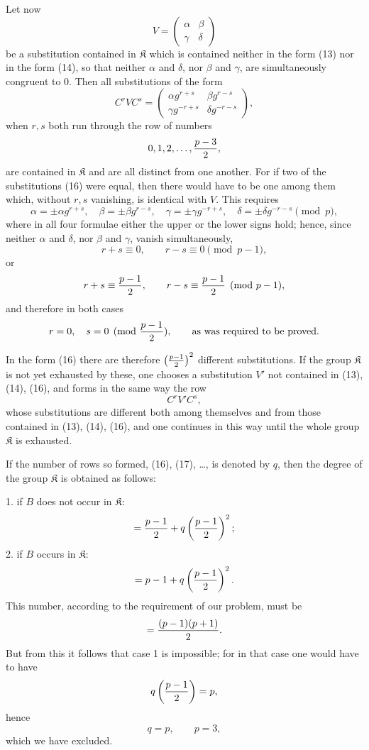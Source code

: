 \documentclass[11pt]{article}
\providecommand{\Kgrp}{\mathfrak K}
\begin{document}
Let now
\begin{equation}
 V=\begin{pmatrix}\alpha&\beta\\ \gamma&\delta\end{pmatrix}
\tag{15}
\end{equation}
be a substitution contained in $\Kgrp$ which is contained neither in the form (13) nor in the form (14), so that neither $\alpha$ and $\delta$, nor $\beta$ and $\gamma$, are simultaneously congruent to $0$. Then all substitutions of the form
\begin{equation}
 C^rVC^s=
 \begin{pmatrix}
 \alpha g^{r+s} & \beta g^{r-s}\\
 \gamma g^{-r+s} & \delta g^{-r-s}
 \end{pmatrix},
\tag{16}
\end{equation}
when $r,s$ both run through the row of numbers
\[
 0,1,2,\ldots,{p-3\over2},
\]
are contained in $\Kgrp$ and are all distinct from one another. For if two of the substitutions (16) were equal, then there would have to be one among them which, without $r,s$ vanishing, is identical with $V$. This requires
\[
 \alpha=\pm\alpha g^{r+s},\quad
 \beta=\pm\beta g^{r-s},\quad
 \gamma=\pm\gamma g^{-r+s},\quad
 \delta=\pm\delta g^{-r-s}\pmod p,
\]
where in all four formulae either the upper or the lower signs hold; hence, since neither $\alpha$ and $\delta$, nor $\beta$ and $\gamma$, vanish simultaneously,
\[
 r+s\equiv0,\qquad r-s\equiv0\pmod{p-1},
\]
or
\[
 r+s\equiv{p-1\over2},\qquad r-s\equiv{p-1\over2}\pmod{p-1},
\]
and therefore in both cases
\[
 r=0,\quad s=0\pmod{{p-1\over2}},\qquad\text{as was required to be proved.}
\]

In the form (16) there are therefore $\left({p-1\over2}\right)^2$ different substitutions. If the group $\Kgrp$ is not yet exhausted by these, one chooses a substitution $V'$ not contained in (13), (14), (16), and forms in the same way the row
\begin{equation}
 C^rV'C^s,
\tag{17}
\end{equation}
whose substitutions are different both among themselves and from those contained in (13), (14), (16), and one continues in this way until the whole group $\Kgrp$ is exhausted.

If the number of rows so formed, (16), (17), \ldots, is denoted by $q$, then the degree of the group $\Kgrp$ is obtained as follows:

1. if $B$ does not occur in $\Kgrp$:
\[
 ={p-1\over2}+q\left({p-1\over2}\right)^2;
\]
2. if $B$ occurs in $\Kgrp$:
\[
 =p-1+q\left({p-1\over2}\right)^2.
\]
This number, according to the requirement of our problem, must be
\[
 ={(p-1)(p+1)\over2}.
\]
But from this it follows that case 1 is impossible; for in that case one would have to have
\[
 q\left({p-1\over2}\right)=p,
\]
hence
\[
 q=p,\qquad p=3,
\]
which we have excluded.
\end{document}
